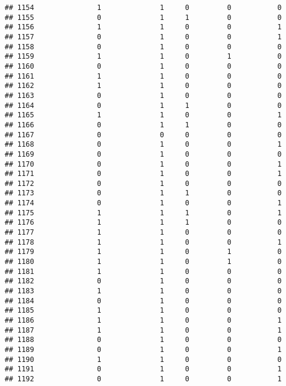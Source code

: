\documentclass[]{article}
\begin{document}
\begin{verbatim}
## 1154               1              1     0         0           0
## 1155               0              1     1         0           0
## 1156               1              1     0         0           1
## 1157               0              1     0         0           1
## 1158               0              1     0         0           0
## 1159               1              1     0         1           0
## 1160               0              1     0         0           0
## 1161               1              1     0         0           0
## 1162               1              1     0         0           0
## 1163               0              1     0         0           0
## 1164               0              1     1         0           0
## 1165               1              1     0         0           1
## 1166               0              1     1         0           0
## 1167               0              0     0         0           0
## 1168               0              1     0         0           1
## 1169               0              1     0         0           0
## 1170               0              1     0         0           1
## 1171               0              1     0         0           1
## 1172               0              1     0         0           0
## 1173               0              1     1         0           0
## 1174               0              1     0         0           1
## 1175               1              1     1         0           1
## 1176               1              1     1         0           0
## 1177               1              1     0         0           0
## 1178               1              1     0         0           1
## 1179               1              1     0         1           0
## 1180               1              1     0         1           0
## 1181               1              1     0         0           0
## 1182               0              1     0         0           0
## 1183               1              1     0         0           0
## 1184               0              1     0         0           0
## 1185               1              1     0         0           0
## 1186               1              1     0         0           1
## 1187               1              1     0         0           1
## 1188               0              1     0         0           0
## 1189               0              1     0         0           1
## 1190               1              1     0         0           0
## 1191               0              1     0         0           1
## 1192               0              1     0         0           1

\end{verbatim}
\end{document}
